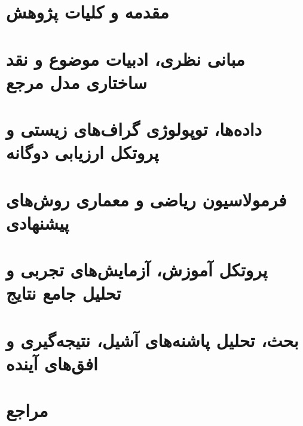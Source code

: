 




\frontmatter
{}
\pagestyle{empty}



\pagestyle{plain}


\tableofcontents
\clearpage
\listoffigures
\clearpage
\listoftables
\clearpage

\mainmatter
{}
\pagestyle{fancy}

\chapter{مقدمه و کلیات پژوهش}


\chapter{مبانی نظری، ادبیات موضوع و نقد ساختاری مدل مرجع}


\chapter{داده‌ها، توپولوژی گراف‌های زیستی و پروتکل ارزیابی دوگانه}


\chapter{فرمولاسیون ریاضی و معماری روش‌های پیشنهادی}


\chapter{پروتکل آموزش، آزمایش‌های تجربی و تحلیل جامع نتایج}


\chapter{بحث، تحلیل پاشنه‌های آشیل، نتیجه‌گیری و افق‌های آینده}


\clearpage
\chapter*{مراجع}
\begin{latin}
\printbibliography[heading=none]
\end{latin}

\clearpage
\pagestyle{plain}



